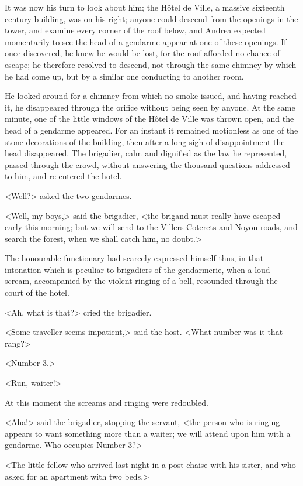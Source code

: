  It was now his turn to look about him; the Hôtel de Ville, a massive sixteenth century building, was on his right; anyone could descend from the openings in the tower, and examine every corner of the roof below, and Andrea expected momentarily to see the head of a gendarme appear at one of these openings. If once discovered, he knew he would be lost, for the roof afforded no chance of escape; he therefore resolved to descend, not through the same chimney by which he had come up, but by a similar one conducting to another room. 

 He looked around for a chimney from which no smoke issued, and having reached it, he disappeared through the orifice without being seen by anyone. At the same minute, one of the little windows of the Hôtel de Ville was thrown open, and the head of a gendarme appeared. For an instant it remained motionless as one of the stone decorations of the building, then after a long sigh of disappointment the head disappeared. The brigadier, calm and dignified as the law he represented, passed through the crowd, without answering the thousand questions addressed to him, and re-entered the hotel. 

 <Well?> asked the two gendarmes. 

 <Well, my boys,> said the brigadier, <the brigand must really have escaped early this morning; but we will send to the Villers-Coterets and Noyon roads, and search the forest, when we shall catch him, no doubt.> 

 The honourable functionary had scarcely expressed himself thus, in that intonation which is peculiar to brigadiers of the gendarmerie, when a loud scream, accompanied by the violent ringing of a bell, resounded through the court of the hotel. 

 <Ah, what is that?> cried the brigadier. 

 <Some traveller seems impatient,> said the host. <What number was it that rang?> 

 <Number 3.> 

 <Run, waiter!> 

 At this moment the screams and ringing were redoubled. 

 <Aha!> said the brigadier, stopping the servant, <the person who is ringing appears to want something more than a waiter; we will attend upon him with a gendarme. Who occupies Number 3?> 

 <The little fellow who arrived last night in a post-chaise with his sister, and who asked for an apartment with two beds.> 

